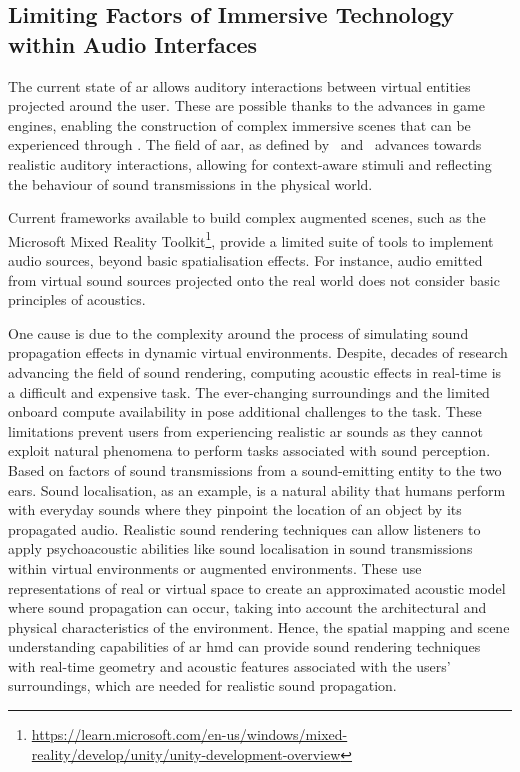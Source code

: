 \subsection{Limiting Factors of Immersive Technology within Audio Interfaces}
The current state of \acrshort{ar} allows auditory interactions between virtual entities projected around the user. These are possible thanks to the advances in game engines, enabling the construction of complex immersive scenes that can be experienced through . The field of \acrfull{aar}, as defined by~\cite{yang2022audio} and~\cite{yang2019audio} advances towards realistic auditory interactions, allowing for context-aware stimuli and reflecting the behaviour of sound transmissions in the physical world.\par
Current frameworks available to build complex augmented scenes, such as the Microsoft Mixed Reality Toolkit\footnote{\url{https://learn.microsoft.com/en-us/windows/mixed-reality/develop/unity/unity-development-overview}}, provide a limited suite of tools to implement audio sources, beyond basic spatialisation effects. For instance, audio emitted from virtual sound sources projected onto the real world does not consider basic principles of acoustics.\par
One cause is due to the complexity around the process of simulating sound propagation effects in dynamic virtual environments. Despite, decades of research advancing the field of sound rendering, computing acoustic effects in real-time is a difficult and expensive task. The ever-changing surroundings and the limited onboard compute availability in  pose additional challenges to the task.
These limitations prevent users from experiencing realistic \acrshort{ar} sounds as they cannot exploit natural phenomena to perform tasks associated with sound perception. Based on factors of sound transmissions from a sound-emitting entity to the two ears. Sound localisation, as an example, is a natural ability that humans perform with everyday sounds where they pinpoint the location of an object by its propagated audio. Realistic sound rendering techniques can allow listeners to apply psychoacoustic abilities like sound localisation in sound transmissions within virtual environments or augmented environments. These use representations of real or virtual space to create an approximated acoustic model where sound propagation can occur, taking into account the architectural and physical characteristics of the environment. Hence, the spatial mapping and scene understanding capabilities of \acrshort{ar} \acrshort{hmd} can provide sound rendering techniques with real-time geometry and acoustic features associated with the users' surroundings, which are needed for realistic sound propagation.\par
